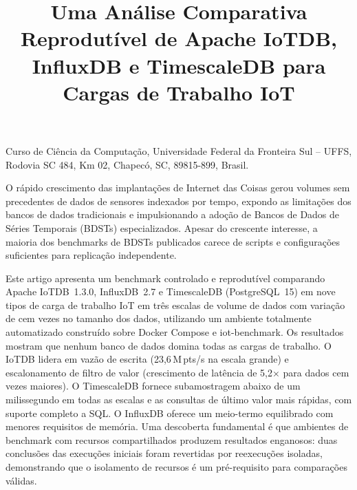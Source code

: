 \documentclass[brazilian]{presets/sbcreviews-2025}%
\title[Uma Análise Comparativa Reprodutível de Apache IoTDB, InfluxDB e TimescaleDB para Cargas de Trabalho IoT]{Uma Análise Comparativa Reprodutível de Apache IoTDB, InfluxDB e TimescaleDB para Cargas de Trabalho IoT}
\author[Klein 2026]{
  \affil{\textbf{Luiz Fernando Klein}~\orcidlink{0009-0001-8949-3248}~\textcolor{blue}{\faEnvelope}~~[{Universidade Federal da Fronteira Sul - UFFS}~|\href{mailto: ...}{~{\textit{luizkleinfernando@gmail.com}}}~]}
}
\begin{document}
\begin{frontmatter}

  \maketitle

  \begin{mail}
    Curso de Ciência da Computação, Universidade Federal da Fronteira Sul -- UFFS, Rodovia SC 484, Km 02, Chapecó, SC, 89815-899, Brasil.
  \end{mail}

  \begin{abstract-pt}
    O rápido crescimento das implantações de Internet das Coisas gerou volumes sem precedentes de
    dados de sensores indexados por tempo, expondo as limitações dos bancos de dados tradicionais e
    impulsionando a adoção de Bancos de Dados de Séries Temporais (BDSTs) especializados. Apesar do
    crescente interesse, a maioria dos benchmarks de BDSTs publicados carece de scripts e
    configurações suficientes para replicação independente.

    Este artigo apresenta um benchmark controlado e reprodutível comparando Apache IoTDB~1.3.0,
    InfluxDB~2.7 e TimescaleDB (PostgreSQL~15) em nove tipos de carga de trabalho IoT em três
    escalas de volume de dados com variação de cem vezes no tamanho dos dados, utilizando um
    ambiente totalmente automatizado construído sobre Docker Compose e iot-benchmark.
    Os resultados mostram que nenhum banco de dados domina todas as cargas de trabalho. O IoTDB
    lidera em vazão de escrita (23,6\,M\,pts/s na escala grande) e escalonamento de filtro de valor
    (crescimento de latência de 5,2$\times$ para dados cem vezes maiores). O TimescaleDB fornece
    subamostragem abaixo de um milissegundo em todas as escalas e as consultas de último valor mais
    rápidas, com suporte completo a SQL. O InfluxDB oferece um meio-termo equilibrado com menores
    requisitos de memória. Uma descoberta fundamental é que ambientes de benchmark com recursos
    compartilhados produzem resultados enganosos: duas conclusões das execuções iniciais foram
    revertidas por reexecuções isoladas, demonstrando que o isolamento de recursos é um pré-requisito
    para comparações válidas.
  \end{abstract-pt}


\end{frontmatter}
\end{document}
